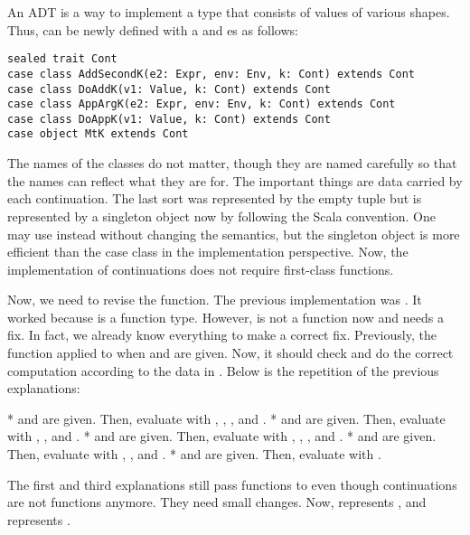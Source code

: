 An ADT is a way to implement a type that consists of values of various shapes.
Thus,  can be newly defined with a  and es as follows:

\begin{verbatim}
sealed trait Cont
case class AddSecondK(e2: Expr, env: Env, k: Cont) extends Cont
case class DoAddK(v1: Value, k: Cont) extends Cont
case class AppArgK(e2: Expr, env: Env, k: Cont) extends Cont
case class DoAppK(v1: Value, k: Cont) extends Cont
case object MtK extends Cont
\end{verbatim}

The names of the classes do not matter, though they are named carefully so that
the names can reflect what they are for. The important things are data carried by
each continuation. The last sort was represented by the empty tuple but is
represented by a singleton object now by following the Scala convention. One may
use  instead without changing the semantics,
but the singleton object is more efficient than the case class in the
implementation perspective. Now, the implementation of continuations does not
require first-class functions.

Now, we need to revise the  function. The previous implementation
was . It worked because
 is a function type. However,  is not a function now and
 needs a fix. In fact, we already know everything to make a
correct fix. Previously, the function applied  to  when 
and  are given. Now, it should check  and do the correct
computation according to the data in . Below is the repetition of the
previous explanations:

*  and  are given. Then, evaluate  with , , ,
and .
*  and  are given. Then, evaluate  with , , and .
*  and  are given. Then, evaluate  with , , , and
.
*  and  are given. Then, evaluate 
with , , and .
* \code{()} and  are given. Then, evaluate  with .

The first and third explanations still pass functions to  even
though continuations are not functions anymore. They need small changes. Now,
 represents , and
 represents .

